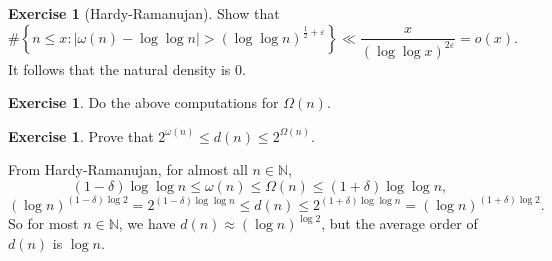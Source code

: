 \documentclass[11pt]{article}
\theoremstyle{definition}
\newtheorem{exe}[thm]{Exercise}
\newcommand{\set}[1]{\left\{ #1 \right\}}
\newcommand{\e}[0]{\varepsilon}
\newcommand{\abs}[1]{\left\lvert#1\right\rvert} %
\newcommand{\NN}{\mathbb{N}}
\begin{document}
\begin{exe}[Hardy-Ramanujan]
Show that
\[
\#\set{n\le x:\abs{\omega(n)-\log\log n}>(\log\log n)^{\frac12+\e}}
\ll \frac{x}{(\log\log x)^{2\e}} = o(x) .
\]
It follows that the natural density is 0.
\end{exe}

\begin{exe}
Do the above computations for $\Omega(n)$.
\end{exe}

\begin{exe}
Prove that $2^{\omega(n)}\le d(n)\le 2^{\Omega(n)}$.
\end{exe}

From Hardy-Ramanujan, for almost all $n\in\NN$,
\[
(1-\delta)\log\log n \le \omega(n) \le \Omega(n) \le (1+\delta)\log\log n ,
\]
\[
(\log n)^{(1-\delta)\log2} = 2^{(1-\delta)\log\log n}
\le d(n) \le 2^{(1+\delta)\log\log n}
= (\log n)^{(1+\delta)\log2} .
\]
So for most $n\in\NN$, we have $d(n)\approx(\log n)^{\log2}$, but the average order of
$d(n)$ is $\log n$.














\end{document}
